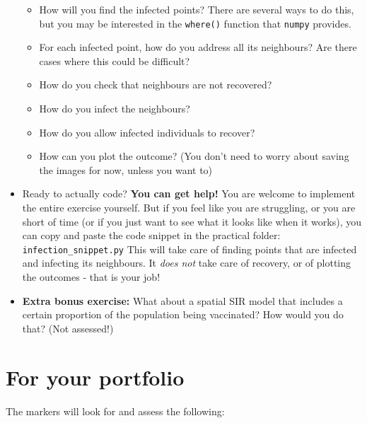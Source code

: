 \documentclass[pdflatex,a4paper]{article}
\begin{document}
\begin{itemize}
\begin{itemize}
\item
How will you find the infected points? There are several ways to do this, but you may be interested in the \verb=where()= function that \verb=numpy= provides.
\item
For each infected point, how do you address all its neighbours? Are there cases where this could be difficult?
\item
How do you check that neighbours are not recovered?
\item
How do you infect the neighbours?
\item
How do you allow infected individuals to recover?
\item
How can you plot the outcome? (You don't need to worry about saving the images for now, unless you want to)
\end{itemize}


\item
Ready to actually code? \textbf{You can get help!} You are welcome to implement the entire exercise yourself. But if you feel like you are struggling, or you are short of time (or if you just want to see what it looks like when it works), you can copy and paste the code snippet in the practical folder: \verb=infection_snippet.py= This will take care of finding points that are infected and infecting its neighbours. It \emph{does not} take care of recovery, or of plotting the outcomes - that is your job! 

\item
\textbf{Extra bonus exercise:} What about a spatial SIR model that includes a certain proportion of the population being vaccinated? How would you do that? (Not assessed!) 

\end{itemize}





\section{For your portfolio}

The markers will look for and assess the following:
\end{document}
